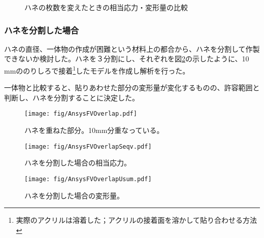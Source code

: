\documentclass[11pt]{ltjsreport}
\newcommand{\figref}[1]{図\ref{#1}}
\begin{document}
\begin{figure}[htbp]
  \begin{minipage}{0.47\textwidth}
  \end{minipage}
  \hfill
  \begin{minipage}{0.47\textwidth}
  \end{minipage}
    \caption{ハネの枚数を変えたときの相当応力・変形量の比較}
  \label{AnsysFVCirc2}
\end{figure}



\subsubsection{ハネを分割した場合}
ハネの直径、一体物の作成が困難という材料上の都合から、ハネを分割して作製できないか検討した。ハネを３分割にし、それぞれを\figref{AnsysFVOverlap}の示したように、10 mmののりしろで接着\footnote{実際のアクリルは溶着した；アクリルの接着面を溶かして貼り合わせる方法}したモデルを作成し解析を行った。

一体物と比較すると、貼りあわせた部分の変形量が変化するものの、許容範囲と判断し、ハネを分割することに決定した。

\begin{figure}[htbp]
\centering
\texttt{[image: fig/AnsysFVOverlap.pdf]}
\caption[ハネを重ねた部分]{ハネを重ねた部分。10mm分重なっている。}
\label{AnsysFVOverlap}
\end{figure}

\begin{figure}[htbp]
\begin{minipage}{0.47\textwidth}
\centering
\texttt{[image: fig/AnsysFVOverlapSeqv.pdf]}
\caption[ハネを分割した場合の相当応力]{ハネを分割した場合の相当応力。}
\label{AnsysFVOverlapSeqv}
\end{minipage}
\hfill
\begin{minipage}{0.47\textwidth}
\centering
\texttt{[image: fig/AnsysFVOverlapUsum.pdf]}
\caption[ハネを分割した場合の変形量]{ハネを分割した場合の変形量。}
\label{AnsysFVOverlapUsum}
\end{minipage}
\end{figure}
\fi%
\end{document}
